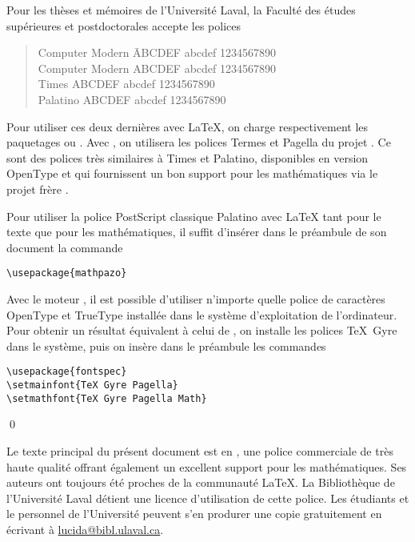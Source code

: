Pour les thèses et mémoires de l'Université Laval, la Faculté des
études supérieures et postdoctorales accepte les polices %
\begin{quote}
  \begin{tabbing}
    Computer Modern \qquad \=  ABCDEF abcdef 1234567890 \kill \\
    {\CM Computer Modern} \> {\CM ABCDEF abcdef 1234567890} \\
    {\Times Times} \> {\Times ABCDEF abcdef 1234567890} \\
    {\Palatino Palatino} \> {\Palatino ABCDEF abcdef 1234567890}
  \end{tabbing}
\end{quote}
Pour utiliser ces deux dernières avec {\LaTeX}, on charge
respectivement les paquetages  ou . Avec
{\XeLaTeX}, on utilisera les polices Termes et Pagella du projet %
.
Ce sont des polices très similaires à Times et Palatino, disponibles
en version OpenType et qui fournissent un bon support pour les
mathématiques via le projet frère %
.

\begin{exemple}
  Pour utiliser la police PostScript classique Palatino avec {\LaTeX}
  tant pour le texte que pour les mathématiques, il suffit d'insérer
  dans le préambule de son document la commande
\begin{lstlisting}
\usepackage{mathpazo}
\end{lstlisting}

  Avec le moteur {\XeLaTeX}, il est possible d'utiliser n'importe
  quelle police de caractères OpenType et TrueType installée dans le
  système d'exploitation de l'ordinateur. Pour obtenir un résultat
  équivalent à celui de , on installe les polices
  TeX~Gyre dans le système, puis on insère dans le préambule les
  commandes
\begin{lstlisting}
\usepackage{fontspec}
\setmainfont{TeX Gyre Pagella}
\setmathfont{TeX Gyre Pagella Math}
\end{lstlisting}
  \qed
\end{exemple}

Le texte principal du présent document est en %
, %
une police commerciale de très haute qualité offrant également un
excellent support pour les mathématiques. Ses auteurs ont toujours été
proches de la communauté {\LaTeX}. La Bibliothèque de l'Université
Laval détient une licence d'utilisation de cette police. Les étudiants
et le personnel de l'Université peuvent s'en produrer une copie
gratuitement en écrivant à
\href{mailto:lucida@bibl.ulaval.ca}{lucida@bibl.ulaval.ca}.



